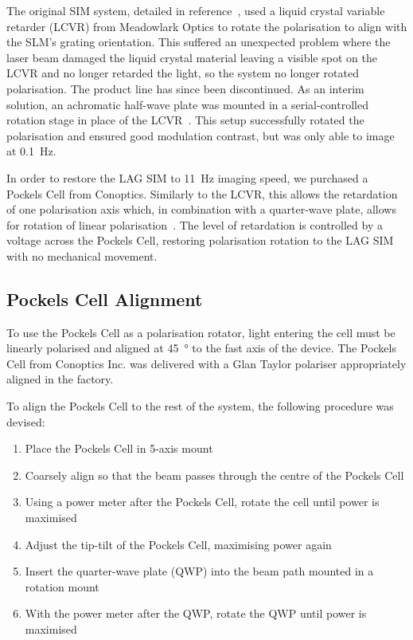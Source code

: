 
The original SIM system, detailed in reference~\cite{young2016guide}, used a liquid crystal variable retarder (LCVR) from Meadowlark Optics to rotate the polarisation to align with the SLM's grating orientation. 
This suffered an unexpected problem where the laser beam damaged the liquid crystal material leaving a visible spot on the LCVR and no longer retarded the light, so the system no longer rotated polarisation. 
The product line has since been discontinued.
As an interim solution, an achromatic half-wave plate was mounted in a serial-controlled rotation stage in place of the LCVR~\cite[\textit{ch. 8}]{hecht2017optics}. 
This setup successfully rotated the polarisation and ensured good modulation contrast, but was only able to image at \SI{0.1}{\hertz}. 

In order to restore the LAG SIM to \SI{11}{\hertz} imaging speed, we purchased a Pockels Cell from Conoptics. 
Similarly to the LCVR, this allows the retardation of one polarisation axis which, in combination with a quarter-wave plate, allows for rotation of linear polarisation~\cite[\textit{ch. 8}]{hecht2017optics}.
The level of retardation is controlled by a voltage across the Pockels Cell, restoring polarisation rotation to the LAG SIM with no mechanical movement. 

\subsection{Pockels Cell Alignment}
To use the Pockels Cell as a polarisation rotator, light entering the cell must be linearly polarised and aligned at \SI{45}{\degree} to the fast axis of the device. 
The Pockels Cell from Conoptics Inc. was delivered with a Glan Taylor polariser appropriately aligned in the factory. 

To align the Pockels Cell to the rest of the system, the following procedure was devised: %
\begin{enumerate}
	\item Place the Pockels Cell in 5-axis mount
	\item Coarsely align so that the beam passes through the centre of the Pockels Cell
	\item Using a power meter after the Pockels Cell, rotate the cell until power is maximised
	\item Adjust the tip-tilt of the Pockels Cell, maximising power again
	\item Insert the quarter-wave plate (QWP) into the beam path mounted in a rotation mount 
	\item With the power meter after the QWP, rotate the QWP until power is maximised
\end{enumerate}

